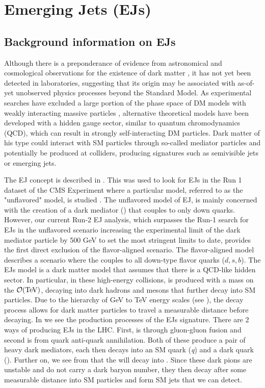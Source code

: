 \chapter{Emerging Jets (EJs) \label{ch:emj}}


\section{Background information on EJs}

Although there is a preponderance of evidence from astronomical and cosmological observations for the existence of dark matter \cite{What_is_DM}, it has not yet been detected in laboratories, suggesting that its origin may be associated with as-of-yet unobserved physics processes beyond the Standard Model.
As experimental searches have excluded a large portion of the phase space of DM models with weakly interacting massive particles \cite{WIMPS}, alternative theoretical models have been developed with a hidden gauge sector, similar to quantum chromodynamics (QCD), which can result in strongly self-interacting DM particles. Dark matter of his type could interact with SM particles through so-called mediator particles and potentially be produced at colliders, producing signatures such as semivisible jets \cite{Nabili:2886140} or emerging jets\cite{sirunyan2019search}.

The EJ concept is described in \cite{Schwaller:2015gea}. This was used to look for EJs in the Run 1 dataset of the CMS Experiment where a particular model, referred to as the "unflavored" model, is studied \cite{sirunyan2019search}. The unflavored model of EJ, is mainly concerned with the creation of a dark mediator (\Mdark) that couples to only down quarks.
However, our current Run-2 EJ analysis, which surpasses the Run-1 search for EJs in the unflavored scenario increasing the experimental limit of the dark mediator particle by 500 GeV to set the most stringent limits to date, provides the first direct exclusion of the flavor-aligned scenario.
The flavor-aligned model describes a scenario where the \Mdark couples to all down-type flavor quarks ($d, s, b$).
The EJs model is a dark matter model that assumes that there is a QCD-like hidden sector. In particular, in these high-energy collisions, \Mdark is produced with a mass on the $\order{\text{TeV}}$, decaying into dark hadrons and mesons that further decay into SM particles. Due to the hierarchy of GeV to TeV energy scales (see ), the decay process allows for dark matter particles to travel a measurable distance before decaying.
In  we see the production processes of the EJs signature. There are 2 ways of producing EJs in the LHC. First, is through gluon-gluon fusion and second is from quark anti-quark annihilation.
Both of these produce a pair of heavy dark mediators, each then decays into an SM quark (\textit{q}) and a dark quark (\Qdark). Further on, we see from  that the \Qdark will decay into \pidark.
Since these dark pions are unstable and do not carry a dark baryon number, they then decay after some measurable distance into SM particles \cite{Bai_2014} and form SM jets that we can detect.


